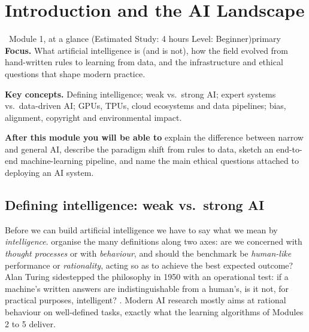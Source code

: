 \documentclass[11pt,a4paper]{article}
\begin{document}
	\clearpage
	\section{Introduction and the AI Landscape}
	
	\begin{modulecard}{\faGlobe\ Module 1, at a glance \hfill \small\normalfont (Estimated Study: 4 hours \textbullet{} Level: Beginner)}{primary}
		\textbf{Focus.} What artificial intelligence is (and is not), how the
		field evolved from hand-written rules to learning from data, and the
		infrastructure and ethical questions that shape modern practice.
		
		\medskip
		\textbf{Key concepts.} Defining intelligence; weak vs.\ strong AI; expert
		systems vs.\ data-driven AI; GPUs, TPUs, cloud ecosystems and data
		pipelines; bias, alignment, copyright and environmental impact.
		
		\medskip
		\textbf{After this module you will be able to} explain the difference
		between narrow and general AI, describe the paradigm shift from rules to
		data, sketch an end-to-end machine-learning pipeline, and name the main
		ethical questions attached to deploying an AI system.
	\end{modulecard}
	
	\subsection{Defining intelligence: weak vs.\ strong AI}
	
	Before we can build artificial intelligence we have to say what we mean by \emph{intelligence}. \textcite{russell2021} organise the many definitions along two axes: are we concerned with \emph{thought	processes} or with \emph{behaviour}, and should the benchmark be \emph{human-like} performance or \emph{rationality}, acting so as to achieve the best expected outcome? Alan Turing sidestepped the 	philosophy in 1950 with an operational test: if a machine's written answers are indistinguishable from a human's, is it not, for practical purposes, intelligent? \parencite{turing1950}. Modern AI research 	mostly aims at rational behaviour on well-defined tasks,  exactly what 	the learning algorithms of Modules 2 to 5 deliver.
	
\end{document}
